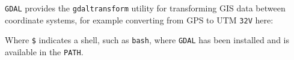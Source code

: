 \texttt{GDAL} provides the \texttt{gdaltransform} utility for transforming GIS data between coordinate systems, for example converting from GPS to UTM \texttt{32V} here:


Where \texttt{\$} indicates a shell, such as \texttt{bash}, where \texttt{GDAL} has been installed and is available in the \texttt{PATH}.
